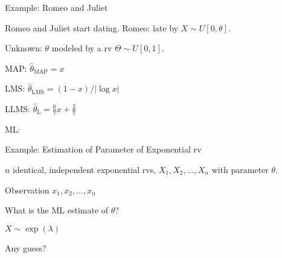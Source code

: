 \begin{frame}{Example: Romeo and Juliet}

\hfill {}

\plitemsep 0.1in
\bci
\item Romeo and Juliet start dating. Romeo: late by $X \sim U[0,\theta].$
\item Unknown: $\theta$ modeled by a rv $\Theta \sim U[0,1].$

\medskip
\item MAP:  $\hat{\theta}_{\text{MAP}} = x$

\item LMS: $\hat{\theta}_{\text{LMS}} = (1-x)/|\log x|$


\item LLMS: $\hat{\theta}_{\text{L}} = \frac{6}{7}x + \frac{2}{7}$

\item ML: 

\eci
\end{frame}

\begin{frame}{Example: Estimation of Parameter of Exponential rv}

\plitemsep 0.1in
\bci
\item $n$ identical, independent exponential rvs, $X_1, X_2,\ldots, X_n$ with parameter $\theta.$

\item<2-> Observation $x_1, x_2, \ldots, x_n$

\item<3-> What is the ML estimate of $\theta$?

\item<4->  $X \sim \exp(\lambda)$

\item<5-> Any guess? 

\eci
\end{frame}


